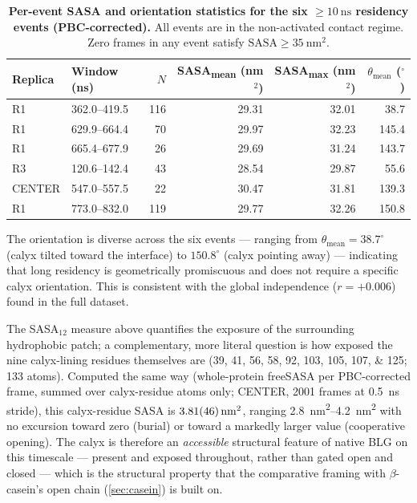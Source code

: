 \documentclass[11pt,a4paper]{article}
\begin{document}
\begin{table}[ht]
  \centering
  \caption{\textbf{Per-event SASA and orientation statistics for the
    six $\geq\!\SI{10}{\nano\second}$ residency events (PBC-corrected).}
    All events are in the non-activated contact regime. Zero frames in
    any event satisfy $\mathrm{SASA} \geq \SI{35}{\nano\metre\squared}$.}
  \label{tab:long-events}
  \begin{tabular}{llrrrr}
    \toprule
    Replica & Window (ns) & $N$ & SASA\textsubscript{mean} (nm$^2$) & SASA\textsubscript{max} (nm$^2$) & $\theta_\mathrm{mean}$ ($^\circ$) \\
    \midrule
    R1      & 362.0--419.5   & 116 & 29.31 & 32.01 &  38.7 \\
    R1      & 629.9--664.4   &  70 & 29.97 & 32.23 & 145.4 \\
    R1      & 665.4--677.9   &  26 & 29.69 & 31.24 & 143.7 \\
    R3      & 120.6--142.4   &  43 & 28.54 & 29.87 &  55.6 \\
    CENTER  & 547.0--557.5   &  22 & 30.47 & 31.81 & 139.3 \\
    R1      & 773.0--832.0   & 119 & 29.77 & 32.26 & 150.8 \\
    \bottomrule
  \end{tabular}
\end{table}

The orientation is diverse across the six events --- ranging from
$\theta_\mathrm{mean} = 38.7^\circ$ (calyx tilted toward the interface)
to $150.8^\circ$ (calyx pointing away) --- indicating that long residency
is geometrically promiscuous and does not require a specific calyx
orientation. This is consistent with the global independence ($r = +0.006$)
found in the full dataset.

The SASA$_{12}$ measure above quantifies the exposure of the surrounding
hydrophobic patch; a complementary, more literal question is how exposed
the nine calyx-lining residues themselves are
(\numlist{39;41;56;58;92;103;105;107;125}; \SI{133}{} atoms). Computed the
same way (whole-protein freeSASA per PBC-corrected frame, summed over
calyx-residue atoms only; CENTER, \num{2001} frames at
\SI{0.5}{\nano\second} stride), this calyx-residue SASA is
$\SI{3.81 \pm 0.46}{\nano\metre\squared}$, ranging
\SIrange{2.8}{4.2}{\nano\metre\squared} with no excursion toward zero
(burial) or toward a markedly larger value (cooperative opening). The
calyx is therefore an \emph{accessible} structural feature of native BLG
on this timescale --- present and exposed throughout, rather than gated
open and closed --- which is the structural property that the
comparative framing with $\beta$-casein's open chain
(\cref{sec:casein}) is built on.
\end{document}
